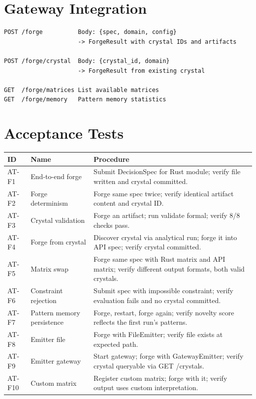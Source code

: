 \documentclass[11pt,a4paper,twoside]{article}
\theoremstyle{definition}
\theoremstyle{plain}
\theoremstyle{remark}
\begin{document}
\section{Gateway Integration}\label{sec:forge:gateway}

\begin{lstlisting}[title={New Gateway Endpoints (added to C19)}]
POST /forge          Body: {spec, domain, config}
                     -> ForgeResult with crystal IDs and artifacts

POST /forge/crystal  Body: {crystal_id, domain}
                     -> ForgeResult from existing crystal

GET  /forge/matrices List available matrices
GET  /forge/memory   Pattern memory statistics
\end{lstlisting}


\section{Acceptance Tests}\label{sec:forge:tests}

\begin{longtable}{l l p{6.5cm}}
\toprule
\textbf{ID} & \textbf{Name} & \textbf{Procedure} \\
\midrule
\endfirsthead \midrule \endhead \bottomrule \endfoot
AT-F1 & End-to-end forge & Submit DecisionSpec for Rust module; verify
  file written and crystal committed. \\
AT-F2 & Forge determinism & Forge same spec twice; verify identical
  artifact content and crystal ID. \\
AT-F3 & Crystal validation & Forge an artifact; run validate formal;
  verify 8/8 checks pass. \\
AT-F4 & Forge from crystal & Discover crystal via analytical run; forge
  it into API spec; verify crystal committed. \\
AT-F5 & Matrix swap & Forge same spec with Rust matrix and API matrix;
  verify different output formats, both valid crystals. \\
AT-F6 & Constraint rejection & Submit spec with impossible constraint;
  verify evaluation fails and no crystal committed. \\
AT-F7 & Pattern memory persistence & Forge, restart, forge again;
  verify novelty score reflects the first run's patterns. \\
AT-F8 & Emitter file & Forge with FileEmitter; verify file exists at
  expected path. \\
AT-F9 & Emitter gateway & Start gateway; forge with GatewayEmitter;
  verify crystal queryable via GET /crystals. \\
AT-F10 & Custom matrix & Register custom matrix; forge with it;
  verify output uses custom interpretation. \\
\end{longtable}
\end{document}
